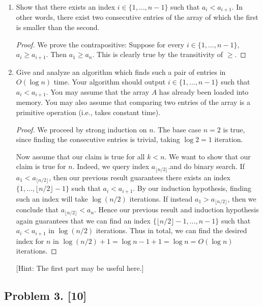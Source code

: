 \documentclass[10pt]{article}
\begin{document}
\begin{enumerate}
\item Show that there exists an index $i \in \{1,\ldots,n-1\}$ such that $a_i < a_{i+1}$. In other words, there exist two consecutive entries of the array of which the first is smaller than the second.

\begin{proof}
  We prove the contrapositive: Suppose for every \(i \in \{1, \ldots, n-1\}\), \(a_i \geq a_{i+1}\). Then \(a_1 \geq a_n\). This is clearly true by the transitivity of \(\geq\).
\end{proof}

\item Give and analyze an algorithm which finds such a pair of entries in $O(\log n)$ time. Your algorithm should output $i \in \{1,\ldots,n-1\}$ such that $a_i < a_{i+1}$. You may assume that the array $A$ has already been loaded into memory. You may also assume that comparing two entries of the array is a primitive operation (i.e., takes constant time).

\begin{proof}
  We proceed by strong induction on \(n\). The base case \(n = 2\) is true, since finding the consecutive entries is trivial, taking \(\log 2 = 1\) iteration. 

  Now assume that our claim is true for all \(k < n\). We want to show that our claim is true for \(n\). Indeed, we query index \(a_{\lfloor{n/2}\rfloor}\).and do binary search. If \(a_1 < a_{\lfloor{n/2}\rfloor}\), then our previous result guarantees there exists an index \(\{1, \ldots, \lfloor n/2\rfloor - 1\}\) such that \(a_i < a_{i + 1}\). By our induction hypothesis, finding such an index will take \(\log (n/2)\) iterations. If instead \(a_1 > a_{\lfloor{n/2}\rfloor}\), then we conclude that \(a_{\lfloor{n/2}\rfloor} < a_n\). Hence our previous result and induction hypothesis again guarantees that we can find an index \(\{\lfloor n/2\rfloor - 1, \ldots, n - 1\}\) such that \(a_i < a_{i + 1}\) in \(\log (n/2)\) iterations. Thus in total, we can find the desired index for \(n\) in \(\log (n/2) + 1 = \log n - 1 + 1 = \log n = O(\log n)\) iterations.
\end{proof}

  [Hint: The first part may be useful here.]
\end{enumerate}

\subsection*{Problem 3. [10]}
\end{document}
